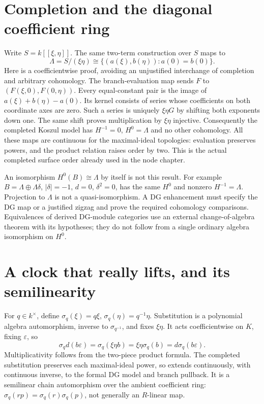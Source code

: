 \documentclass[11pt,oneside,openany]{book}
\theoremstyle{definition}\newtheorem{definition}[theorem]{Definition}
\theoremstyle{remark}\newtheorem{remark}[theorem]{Remark}
\begin{document}
\section{Completion and the diagonal coefficient ring}
Write $S=k[[\xi,\eta]]$. The same two-term construction over $S$ maps to
\[
 \Lambda=S/(\xi\eta)\cong
 \{(a(\xi),b(\eta)):a(0)=b(0)\}.
\]
Here is a coefficientwise proof, avoiding an unjustified interchange of
completion and arbitrary cohomology. The branch-evaluation map sends
$F$ to $(F(\xi,0),F(0,\eta))$. Every equal-constant pair is the image of
$a(\xi)+b(\eta)-a(0)$. Its kernel consists of series whose coefficients
on both coordinate axes are zero. Such a series is uniquely $\xi\eta G$
by shifting both exponents down one. The same shift proves multiplication
by $\xi\eta$ injective. Consequently the completed Koszul model has
$H^{-1}=0$, $H^0=\Lambda$ and no other cohomology. All these maps are
continuous for the maximal-ideal topologies: evaluation preserves powers,
and the product relation raises order by two. This is the actual completed
surface order already used in the node chapter.

An isomorphism $H^0(B)\cong\Lambda$ by itself is not this result.
For example $B=\Lambda\oplus\Lambda\delta$, $|\delta|=-1$, $d=0$,
$\delta^2=0$, has the same $H^0$ and nonzero $H^{-1}=\Lambda$.
Projection to $\Lambda$ is not a quasi-isomorphism. A DG enhancement must
specify the DG map or a justified zigzag and prove the required cohomology
comparisons. Equivalences of derived DG-module categories use an external
change-of-algebra theorem with its hypotheses; they do not follow from a
single ordinary algebra isomorphism on $H^0$.

\section{A clock that really lifts, and its semilinearity}
For $q\in k^\times$, define $\sigma_q(\xi)=q\xi$,
$\sigma_q(\eta)=q^{-1}\eta$. Substitution is a polynomial algebra
automorphism, inverse to $\sigma_{q^{-1}}$, and fixes $\xi\eta$.
It acts coefficientwise on $K$, fixing $\varepsilon$, so
\[
 \sigma_q d(b\varepsilon)=\sigma_q(\xi\eta b)
 =\xi\eta\sigma_q(b)=d\sigma_q(b\varepsilon).
\]
Multiplicativity follows from the two-piece product formula. The completed
substitution preserves each maximal-ideal power, so extends continuously,
with continuous inverse, to the formal DG model and branch pullback.
It is a semilinear chain automorphism over the ambient coefficient ring:
$\sigma_q(rp)=\sigma_q(r)\sigma_q(p)$, not generally an $R$-linear map.
\end{document}
